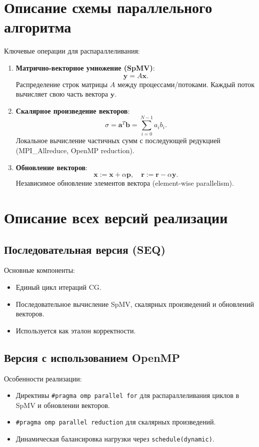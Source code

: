 \documentclass[12pt]{article}
\begin{document}
\section{Описание схемы параллельного алгоритма}

Ключевые операции для распараллеливания:
\begin{enumerate}
    \item \textbf{Матрично-векторное умножение (SpMV)}: 
    \[
    \mathbf{y} = A\mathbf{x}.
    \]
    Распределение строк матрицы \(A\) между процессами/потоками. Каждый поток вычисляет свою часть вектора \(\mathbf{y}\).

    \item \textbf{Скалярное произведение векторов}:
    \[
    \sigma = \mathbf{a}^T \mathbf{b} = \sum_{i=0}^{N-1} a_i b_i.
    \]
    Локальное вычисление частичных сумм с последующей редукцией (MPI\_Allreduce, OpenMP reduction).

    \item \textbf{Обновление векторов}:
    \[
    \mathbf{x} := \mathbf{x} + \alpha \mathbf{p}, \quad 
    \mathbf{r} := \mathbf{r} - \alpha \mathbf{y}.
    \]
    Независимое обновление элементов вектора (element-wise parallelism).
\end{enumerate}

\section{Описание всех версий реализации}

\subsection{Последовательная версия (SEQ)}

Основные компоненты:
\begin{itemize}
    \item Единый цикл итераций CG.
    \item Последовательное вычисление SpMV, скалярных произведений и обновлений векторов.
    \item Используется как эталон корректности.
\end{itemize}

\subsection{Версия с использованием OpenMP}

Особенности реализации:
\begin{itemize}
    \item Директивы \texttt{\#pragma omp parallel for} для распараллеливания циклов в SpMV и обновлении векторов.
    \item \texttt{\#pragma omp parallel reduction} для скалярных произведений.
    \item Динамическая балансировка нагрузки через \texttt{schedule(dynamic)}.
\end{itemize}
\end{document}
